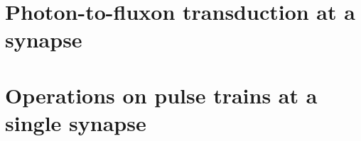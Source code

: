 \documentclass[twocolumn]{article}
\begin{document}
\section{\label{sec:synapse}Photon-to-fluxon transduction at a synapse}

\begin{figure} 
\end{figure}

\section{\label{sec:short_term}Operations on pulse trains at a single synapse}

\begin{figure} 
\end{figure}
\end{document}
